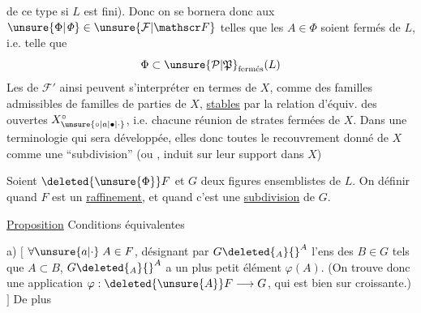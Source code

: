 de ce type si $L$ est fini). Donc on se bornera donc aux $\unsure{\Phi|\mathit{\Phi}}\in\unsure{\mathcal F|\mathscr F}$ telles que les $A\in\Phi$ soient fermés de $L$, i.e. telle que
\[ \Phi\subset\unsure{\mathcal P|\mathfrak P}_{\text{fermés}}(L) \]
Les  de $\mathcal F'$ ainsi  peuvent s'interpréter en termes de $X$, comme des familles admissibles  de familles de
parties  de $X$,  \uline{stables} par la relation d'équiv. des   ouvertes $X_{\unsure{\circ|a|\bullet|\cdot}}^\circ$, i.e. chacune réunion de strates fermées de $X$.
Dans une terminologie qui sera développée, elles  donc toutes le recouvrement donné de $X$ comme une ``subdivision''\unsure{,|;} (ou ,  induit sur leur support dans $X$)


Soient $\deleted{\unsure{\Phi}}F$ et $G$ deux figures ensemblistes de $L$. On  définir quand $F$ est un \uline{raffinement}, et quand c'est une \uline{subdivision} de $G$.

\uline{Proposition} Conditions équivalentes

a) $[$ $\forall\unsure{a|\cdot}\;A\in F$, désignant par $G\deleted{{}_A}{}^A$ l'ens des $B\in G$ tels que $A\subset B$, $G\deleted{{}_A}{}^A$ a un plus petit
élément $\varphi(A)$. (On trouve donc une application $\varphi:\deleted{\unsure{A}}F\longrightarrow G$, qui est bien sur croissante.) $]$ De plus
